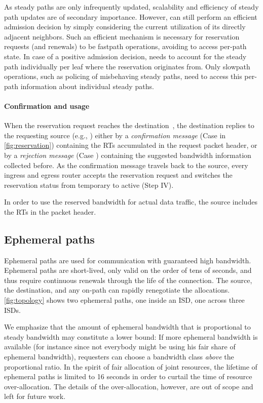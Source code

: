 As steady paths are only infrequently updated, scalability and
efficiency of steady path updates are of secondary importance.
However,  can still perform an efficient admission decision by
simply considering the current utilization of its directly adjacent
\AD neighbors.
Such an efficient mechanism is necessary for reservation requests (and
renewals) to be fastpath operations, avoiding to access per-path state.
In case of a positive admission decision,  needs to account for
the steady path individually per leaf \AD where the reservation
originates from. Only slowpath operations, such as policing of
misbehaving steady paths, need to access this per-path information
about individual steady paths.

\paragraph{Confirmation and usage} When the reservation request reaches the
destination~, the destination replies to the requesting source (e.g., )
either by a \textit{confirmation message} (Case  in
\autoref{fig:reservation}) containing the RTs accumulated in the request packet
header, or by a \textit{rejection message} (Case ) containing the
suggested bandwidth information collected before. As
the confirmation message travels back to the source, every ingress and egress
router accepts the reservation request and switches the reservation status from
temporary to active (Step IV).

In order to use the reserved bandwidth for actual data traffic, the
source includes the RTs in the packet header.


\subsection{Ephemeral paths}
\label{sec:ephemeral}

\noindent Ephemeral paths are used for communication with guaranteed high
bandwidth. Ephemeral paths are short-lived, only valid on the order of tens of
seconds, and thus require continuous renewals through the life of the connection.
The source, the destination, and any on-path \AD can rapidly renegotiate the
allocations. \autoref{fig:topology} shows two ephemeral paths, one inside an
ISD, one across three ISDs.

We emphasize that the amount of ephemeral bandwidth that is proportional to
steady bandwidth may constitute a lower bound: If more ephemeral bandwidth is
available (for instance since not everybody might be using his fair share of
ephemeral bandwidth), requesters can choose a bandwidth class \emph{above} the
proportional ratio. In the spirit of fair allocation of joint resources, the
lifetime of ephemeral paths is limited to 16 seconds in order to curtail the
time of resource over-allocation. The details of the over-allocation, however,
are out of scope and left for future work.

